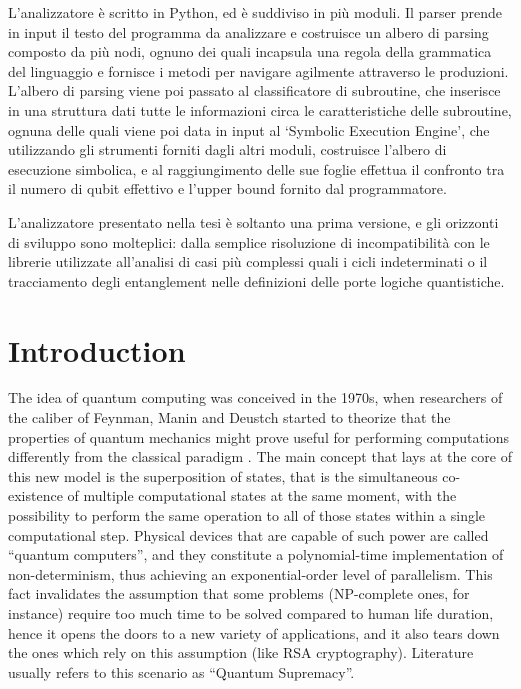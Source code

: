 \documentclass[12pt,a4paper]{report}
\theoremstyle{definition}
\theoremstyle{definition}
\theoremstyle{definition}
\begin{document}
L'analizzatore è scritto in Python, ed è suddiviso in più moduli. Il parser prende in input il testo del programma da analizzare e costruisce un albero di parsing composto da più nodi, ognuno dei quali incapsula una regola della grammatica del linguaggio e fornisce i metodi per navigare agilmente attraverso le produzioni. L'albero di parsing viene poi passato al classificatore di subroutine, che inserisce in una struttura dati tutte le informazioni circa le caratteristiche delle subroutine, ognuna delle quali viene poi data in input al `Symbolic Execution Engine', che utilizzando gli strumenti forniti dagli altri moduli, costruisce l'albero di esecuzione simbolica, e al raggiungimento delle sue foglie effettua il confronto tra il numero di qubit effettivo e l'upper bound fornito dal programmatore.

L'analizzatore presentato nella tesi è soltanto una prima versione, e gli orizzonti di sviluppo sono molteplici: dalla semplice risoluzione di incompatibilità con le librerie utilizzate all'analisi di casi più complessi quali i cicli indeterminati o il tracciamento degli entanglement nelle definizioni delle porte logiche quantistiche.








\tableofcontents



\chapter{Introduction}
\par The idea of quantum computing was conceived in the 1970s, when researchers of the caliber of Feynman, Manin and Deustch started to theorize that the properties of quantum mechanics might prove useful for performing computations differently from the classical paradigm \cite{zuw}. The main concept that lays at the core of this new model is the superposition of states, that is the simultaneous co-existence of multiple computational states at the same moment, with the possibility to perform the same operation to all of those states within a single computational step. Physical devices that are capable of such power are called ``quantum computers'', and they constitute a polynomial-time implementation of non-determinism, thus achieving an exponential-order level of parallelism. This fact invalidates the assumption that some problems (NP-complete ones, for instance) require too much time to be solved compared to human life duration, hence it opens the doors to a new variety of applications, and it also tears down the ones which rely on this assumption (like RSA cryptography). Literature usually refers to this scenario as ``Quantum Supremacy''.
\end{document}
